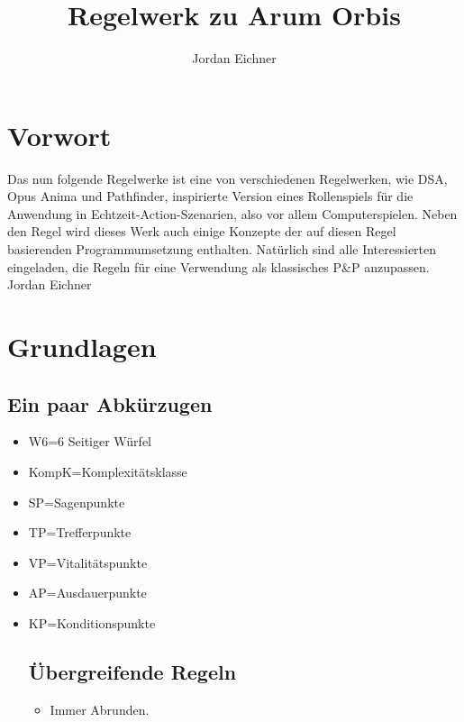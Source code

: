 \documentclass[a4paper,12pt,oneside]{book}
\author{Jordan Eichner}
\title{Regelwerk zu Arum Orbis}
\date{}
\begin{document}
\maketitle
\part*{Vorwort}
Das nun folgende Regelwerke ist eine von verschiedenen Regelwerken, wie DSA, Opus Anima und Pathfinder, inspirierte Version eines Rollenspiels für die Anwendung in Echtzeit-Action-Szenarien, also vor allem Computerspielen. Neben den Regel wird dieses Werk auch einige Konzepte der auf diesen Regel basierenden Programmumsetzung enthalten. Natürlich sind alle Interessierten eingeladen, die Regeln für eine Verwendung als klassisches P\&P anzupassen.
Jordan Eichner

\tableofcontents
  
\part{Grundlagen}
\chapter{Ein paar Abkürzugen}
\begin{itemize}
\item W6=6 Seitiger Würfel
\item KompK=Komplexitätsklasse
\item SP=Sagenpunkte
\item TP=Trefferpunkte
\item VP=Vitalitätspunkte
\item AP=Ausdauerpunkte
\item KP=Konditionspunkte

\chapter{Übergreifende Regeln}
\begin{itemize}
\item Immer Abrunden.
\end{itemize}

\end{itemize}
\end{document}
